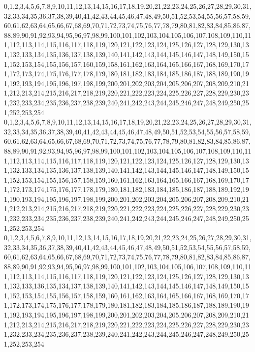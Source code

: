 \documentclass[12pt]{article}
\begin{document}
{0,1,2,3,4,5,6,7,8,9,10,11,12,13,14,15,16,17,18,19,20,21,22,23,24,25,26,27,28,29,30,31,32,33,34,35,36,37,38,39,40,41,42,43,44,45,46,47,48,49,50,51,52,53,54,55,56,57,58,59,60,61,62,63,64,65,66,67,68,69,70,71,72,73,74,75,76,77,78,79,80,81,82,83,84,85,86,87,88,89,90,91,92,93,94,95,96,97,98,99,100,101,102,103,104,105,106,107,108,109,110,111,112,113,114,115,116,117,118,119,120,121,122,123,124,125,126,127,128,129,130,131,132,133,134,135,136,137,138,139,140,141,142,143,144,145,146,147,148,149,150,151,152,153,154,155,156,157,160,159,158,161,162,163,164,165,166,167,168,169,170,171,172,173,174,175,176,177,178,179,180,181,182,183,184,185,186,187,188,189,190,191,192,193,194,195,196,197,198,199,200,201,202,203,204,205,206,207,208,209,210,211,212,213,214,215,216,217,218,219,220,221,222,223,224,225,226,227,228,229,230,231,232,233,234,235,236,237,238,239,240,241,242,243,244,245,246,247,248,249,250,251,252,253,254\\
0,1,2,3,4,5,6,7,8,9,10,11,12,13,14,15,16,17,18,19,20,21,22,23,24,25,26,27,28,29,30,31,32,33,34,35,36,37,38,39,40,41,42,43,44,45,46,47,48,49,50,51,52,53,54,55,56,57,58,59,60,61,62,63,64,65,66,67,68,69,70,71,72,73,74,75,76,77,78,79,80,81,82,83,84,85,86,87,88,89,90,91,92,93,94,95,96,97,98,99,100,101,102,103,104,105,106,107,108,109,110,111,112,113,114,115,116,117,118,119,120,121,122,123,124,125,126,127,128,129,130,131,132,133,134,135,136,137,138,139,140,141,142,143,144,145,146,147,148,149,150,151,152,153,154,155,156,157,158,159,160,161,162,163,164,165,166,167,168,169,170,171,172,173,174,175,176,177,178,179,180,181,182,183,184,185,186,187,188,189,192,191,190,193,194,195,196,197,198,199,200,201,202,203,204,205,206,207,208,209,210,211,212,213,214,215,216,217,218,219,220,221,222,223,224,225,226,227,228,229,230,231,232,233,234,235,236,237,238,239,240,241,242,243,244,245,246,247,248,249,250,251,252,253,254\\
0,1,2,3,4,5,6,7,8,9,10,11,12,13,14,15,16,17,18,19,20,21,22,23,24,25,26,27,28,29,30,31,32,33,34,35,36,37,38,39,40,41,42,43,44,45,46,47,48,49,50,51,52,53,54,55,56,57,58,59,60,61,62,63,64,65,66,67,68,69,70,71,72,73,74,75,76,77,78,79,80,81,82,83,84,85,86,87,88,89,90,91,92,93,94,95,96,97,98,99,100,101,102,103,104,105,106,107,108,109,110,111,112,113,114,115,116,117,118,119,120,121,122,123,124,125,126,127,128,129,130,131,132,133,136,135,134,137,138,139,140,141,142,143,144,145,146,147,148,149,150,151,152,153,154,155,156,157,158,159,160,161,162,163,164,165,166,167,168,169,170,171,172,173,174,175,176,177,178,179,180,181,182,183,184,185,186,187,188,189,190,191,192,193,194,195,196,197,198,199,200,201,202,203,204,205,206,207,208,209,210,211,212,213,214,215,216,217,218,219,220,221,222,223,224,225,226,227,228,229,230,231,232,233,234,235,236,237,238,239,240,241,242,243,244,245,246,247,248,249,250,251,252,253,254\\
}
\end{document}
